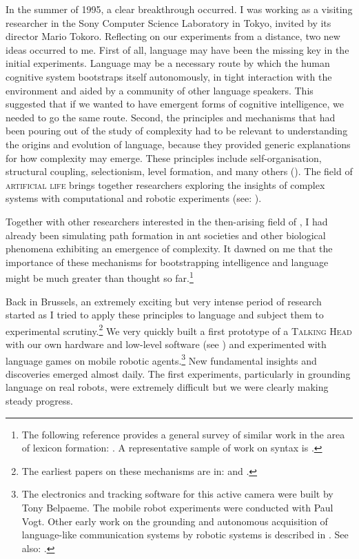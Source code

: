 In the summer of 1995, a clear breakthrough occurred.  
I was working as a visiting researcher in the Sony
Computer Science Laboratory in Tokyo, invited by its director
Mario Tokoro. Reflecting on our 
experiments from a distance, two new ideas occurred to me. 
First of all, language may have been the missing key
in the initial experiments. Language may 
be a necessary route by which the human cognitive system
bootstraps itself autonomously, in tight interaction with the
environment and aided by a community of other
language speakers. This suggested that if we wanted
to have emergent
forms of cognitive intelligence, we needed to go the same 
route. Second, the principles and mechanisms that had been
pouring out of the study of complexity had to be
relevant to understanding the origins and evolution of language,
because they provided generic explanations for how complexity 
may emerge. These principles include 
self-organisation, structural coupling, 
selectionism, level formation, 
and many others (\citealt{Nicolis:1989}). The field of {\scshape artificial life} brings together researchers
exploring the insights of complex systems with computational
and robotic experiments (see: \citealt{Langton:1995}).

Together with 
other researchers interested in the then-arising field of , I had 
already been simulating path formation in 
ant societies and other biological phenomena exhibiting 
an emergence of complexity. It dawned on me that the
importance of these mechanisms for bootstrapping intelligence and
language might be much greater than 
thought so far.\footnote{The following reference provides a general survey of similar work in 
the area of lexicon formation: \cite{Steels:97b}. 
A representative sample of work on syntax is \cite{Briscoe:1999}.}

\clearpage
Back in Brussels, an extremely exciting but very 
intense period of research started as I tried to 
apply these principles to language
and subject them to experimental 
scrutiny.\footnote{The earliest papers on these mechanisms are in: \cite{Steels:95b} and 
\cite{Steels:96a}.}
We very quickly built a first 
prototype of a {\scshape Talking Head} with our own hardware
and low-level software (see ) 
and experimented with language games on mobile 
robotic agents.\footnote{The electronics and tracking software for this 
active camera were built by Tony Belpaeme. The mobile
robot experiments were conducted with Paul Vogt. 
Other early work on the grounding and autonomous acquisition of 
language-like communication systems by robotic systems is 
described in \cite{Steels:97g}. See also: \cite{Billard:1998}.}
New fundamental insights and discoveries emerged almost daily. 
The first experiments, particularly in grounding
language on real robots, were extremely difficult but we 
were clearly making steady progress. 



